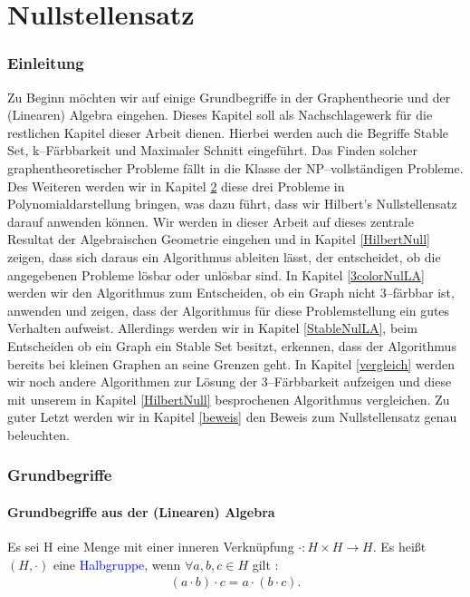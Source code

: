 
\part*{Nullstellensatz}


\section{Einleitung}

Zu Beginn möchten wir auf einige Grundbegriffe in der Graphentheorie und der (Linearen) Algebra eingehen. Dieses Kapitel soll als Nachschlagewerk für die restlichen Kapitel dieser Arbeit dienen. Hierbei werden auch die Begriffe Stable Set, k--Färbbarkeit und Maximaler Schnitt eingeführt. Das Finden solcher graphentheoretischer Probleme fällt in die Klasse der NP--vollständigen Probleme. Des Weiteren werden wir in Kapitel \ref{Grundbegriffe} diese drei Probleme in Polynomialdarstellung  bringen, was dazu führt, dass wir Hilbert's Nullstellensatz darauf anwenden können. Wir werden in dieser Arbeit auf dieses zentrale Resultat der Algebraischen Geometrie eingehen und in Kapitel \ref{HilbertNull} zeigen, dass sich daraus ein Algorithmus ableiten lässt, der entscheidet, ob die angegebenen Probleme lösbar oder unlösbar sind. In Kapitel \ref{3colorNulLA} werden wir den Algorithmus zum Entscheiden, ob ein Graph nicht 3--färbbar ist, anwenden und zeigen, dass der Algorithmus für diese Problemstellung ein gutes Verhalten aufweist. Allerdings werden wir in Kapitel \ref{StableNulLA}, beim Entscheiden ob ein Graph ein Stable Set besitzt, erkennen, dass der Algorithmus bereits bei kleinen Graphen an seine Grenzen geht. In Kapitel \ref{vergleich} werden wir noch andere Algorithmen zur Lösung der 3--Färbbarkeit aufzeigen und diese mit unserem in Kapitel \ref{HilbertNull} besprochenen Algorithmus vergleichen. Zu guter Letzt werden wir in Kapitel \ref{beweis} den Beweis zum Nullstellensatz genau beleuchten.

\section{Grundbegriffe}  \label{Grundbegriffe}

\subsection{Grundbegriffe aus der (Linearen) Algebra}

\begin{definition}
Es sei H eine Menge mit einer inneren Verknüpfung $\cdot : H \times H \rightarrow H$. Es heißt $(H,\cdot)$ eine \textcolor{blue}{Halbgruppe}, wenn $\forall a,b,c \in H$ gilt \cite{Karpfinger}: 
\begin{align*}
(a \cdot b) \cdot c = a \cdot ( b \cdot c ).
\end{align*}
\end{definition}

